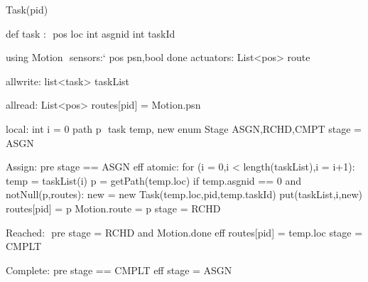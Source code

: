 Task(pid)

def task : $\label{taskdef}$
    pos loc
    int asgnid
    int taskId

using Motion $\label{moddef}$
    sensors:`
       pos psn,bool done
    actuators:
       List<pos> route

allwrite:$\label{awvar}$
   list<task> taskList
 
allread:$\label{arvar}$
   List<pos> routes[pid] = Motion.psn

local:
   int i = 0 
   path p $\label{pathvar}$
   task temp, new
   enum Stage {ASGN,RCHD,CMPT} stage
                             = ASGN
   
Assign:$\label{asgnevent}$
  pre stage == ASGN
  eff atomic:
    for (i = 0,i < length(taskList),i = i+1):
        temp = taskList(i)
        p = getPath(temp.loc)
        if temp.asgnid == 0 and notNull(p,routes):
           new = new Task(temp.loc,pid,temp.taskId)
           put(taskList,i,new)
           routes[pid] = p
           Motion.route = p 
           stage = RCHD          
   
Reached: $\label{rchevent}$
  pre stage = RCHD and Motion.done
  eff routes[pid] = temp.loc
      stage = CMPLT

Complete:$\label{cmpltevent}$
  pre stage == CMPLT
  eff stage = ASGN